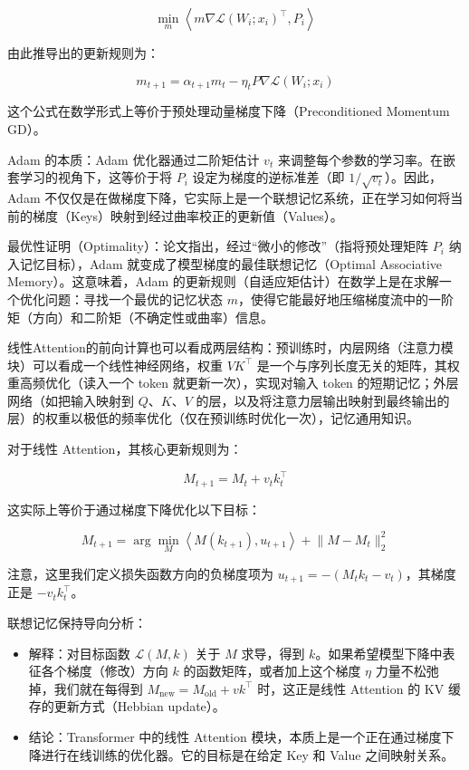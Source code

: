 \[
\min_m\left\langle m\nabla\mathcal{L}(W_i;x_i)^\top,P_i\right\rangle
\]

由此推导出的更新规则为：

\[
m_{t+1}=\alpha_{t+1}m_t-\eta_tP\nabla\mathcal{L}(W_i;x_i)
\]

这个公式在数学形式上等价于预处理动量梯度下降（Preconditioned Momentum GD）。

Adam 的本质：Adam 优化器通过二阶矩估计 \(v_t\) 来调整每个参数的学习率。在嵌套学习的视角下，这等价于将 \(P_i\) 设定为梯度的逆标准差（即 \(1/\sqrt{v_t}\)）。因此，Adam 不仅仅是在做梯度下降，它实际上是一个联想记忆系统，正在学习如何将当前的梯度（Keys）映射到经过曲率校正的更新值（Values）。

最优性证明（Optimality）：论文指出，经过``微小的修改''（指将预处理矩阵 \(P_i\) 纳入记忆目标），Adam 就变成了模型梯度的最佳联想记忆（Optimal Associative Memory）。这意味着，Adam 的更新规则（自适应矩估计）在数学上是在求解一个优化问题：寻找一个最优的记忆状态 \(m\)，使得它能最好地压缩梯度流中的一阶矩（方向）和二阶矩（不确定性或曲率）信息。

线性Attention的前向计算也可以看成两层结构：预训练时，内层网络（注意力模块）可以看成一个线性神经网络，权重 \(VK^\top\) 是一个与序列长度无关的矩阵，其权重高频优化（读入一个 token 就更新一次），实现对输入 token 的短期记忆；外层网络（如把输入映射到 \(Q\)、\(K\)、\(V\) 的层，以及将注意力层输出映射到最终输出的层）的权重以极低的频率优化（仅在预训练时优化一次），记忆通用知识。

对于线性 Attention，其核心更新规则为：

\[
M_{t+1}=M_t+v_tk_t^\top
\tag{16}
\]

这实际上等价于通过梯度下降优化以下目标：

\[
M_{t+1}=\arg\min_M\left\langle M(k_{t+1}),u_{t+1}\right\rangle+\lVert M-M_t\rVert_2^2
\tag{15}
\]

注意，这里我们定义损失函数方向的负梯度项为 \(u_{t+1}=-(M_tk_t-v_t)\)，其梯度正是 \(-v_tk_t^\top\)。

联想记忆保持导向分析：

\begin{itemize}
\tightlist
\item
  解释：对目标函数 \(\mathcal{L}(M,k)\) 关于 \(M\) 求导，得到 \(k\)。如果希望模型下降中表征各个梯度（修改）方向 \(k\) 的函数矩阵，或者加上这个梯度 \(\eta\) 力量不松弛掉，我们就在每得到 \(M_{\mathrm{new}}=M_{\mathrm{old}}+vk^\top\) 时，这正是线性 Attention 的 KV 缓存的更新方式（Hebbian update）。
\item
  结论：Transformer 中的线性 Attention 模块，本质上是一个正在通过梯度下降进行在线训练的优化器。它的目标是在给定 Key 和 Value 之间映射关系。
\end{itemize}

